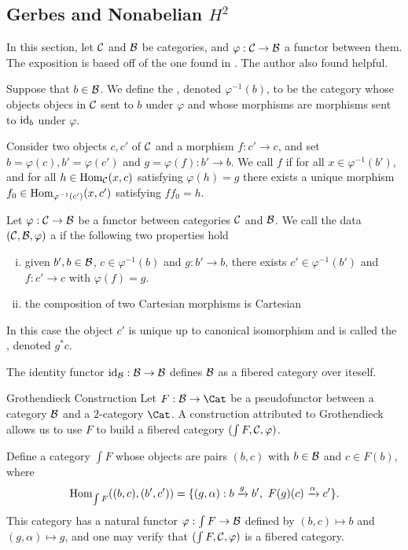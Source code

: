 \subsection{Gerbes and Nonabelian $H^2$}
In this section, let $\mathcal{C}$ and $\mathcal{B}$ be categories, and $\varphi: \mathcal{C}\rightarrow\mathcal{B}$ a functor between them.  The exposition is based off of the one found in \cite{milne1980etale}.  The author also found \cite{vistoli2008notes} helpful.
\begin{defn}
Suppose that $b\in\mathcal{B}$.  We define the , denoted $\varphi^{-1}(b)$, to be the category whose objects objecs in $\mathcal{C}$ sent to $b$ under $\varphi$ and whose morphisms are morphisms sent to $\textnormal{id}_b$ under $\varphi$.
\end{defn}

\begin{defn}
Consider two objects $c,c'$ of $\mathcal{C}$ and a morphism $f:c'\rightarrow c$, and set $b = \varphi(c), b'=\varphi(c')$ and $g = \varphi(f):b'\rightarrow b$.  We call $f$  if for all $x\in \varphi^{-1}(b')$, and for all $h\in \textnormal{Hom}_{\mathcal{C}}(x,c)$ satisfying $\varphi(h) = g$ there exists a unique morphism $f_0\in\textnormal{Hom}_{\varphi^{-1}(c')}(x,c')$ satisfying $ff_0 = h$.
\end{defn}

\begin{defn}
Let $\varphi: \mathcal{C}\rightarrow\mathcal{B}$ be a functor between categories $\mathcal{C}$ and $\mathcal{B}$.  We call the data $(\mathcal{C},\mathcal{B},\varphi)$ a  if the following two properties hold
\begin{enumerate}[(i)]
\item  given $b',b\in\mathcal{B}$, $c\in\varphi^{-1}(b)$ and $g: b'\rightarrow b$, there exists $c'\in\varphi^{-1}(b')$ and $f:c'\rightarrow c$ with $\varphi(f) = g$.
\item  the composition of two Cartesian morphisms is Cartesian
\end{enumerate}
In this case the object $c'$ is unique up to canonical isomorphism and is called the , denoted $g^*c$.
\end{defn}

\begin{ex}
The identity functor $\textnormal{id}_{\mathcal{B}}:\mathcal{B}\rightarrow\mathcal{B}$ defines $\mathcal{B}$ as a fibered category over iteself.
\end{ex}

\begin{ex}{Grothendieck Construction}
Let $F: \catb\rightarrow \Cat$ be a pseudofunctor between a category $\mathcal{B}$ and a $2$-category $\Cat$.  A construction attributed to Grothendieck allows us to use $F$ to build a fibered category $(\int F,\mathcal{C}, \varphi)$.

Define a category $\int F$ whose objects are pairs $(b,c)$ with $b\in\mathcal{B}$ and $c\in F(b)$, where
$$\Hom_{\int F}((b,c),(b',c')) = \{(g,\alpha) : b\xrightarrow{g}b',\ F(g)(c)\xrightarrow{\alpha}c'\}.$$
This category has a natural functor $\varphi: \int F\rightarrow \mathcal{B}$ defined by $(b,c)\mapsto b$ and $(g,\alpha)\mapsto g$, and one may verify that $(\int F,\mathcal{C},\varphi)$ is a fibered category.
\end{ex}

